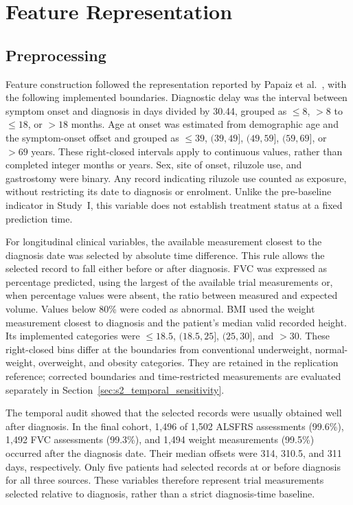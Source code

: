 \section{Feature Representation}
\label{sec:s2_features}

\subsection{Preprocessing}
\label{subsec:s2_preprocessing}

Feature construction followed the representation reported by Papaiz et al.~\cite{Papaiz2024}, with the following implemented boundaries. Diagnostic delay was the interval between symptom onset and diagnosis in days divided by 30.44, grouped as $\leq8$, $>8$ to $\leq18$, or $>18$ months. Age at onset was estimated from demographic age and the symptom-onset offset and grouped as $\leq39$, $(39,49]$, $(49,59]$, $(59,69]$, or $>69$ years. These right-closed intervals apply to continuous values, rather than completed integer months or years. Sex, site of onset, riluzole use, and gastrostomy were binary. Any record indicating riluzole use counted as exposure, without restricting its date to diagnosis or enrolment. Unlike the pre-baseline indicator in Study~I, this variable does not establish treatment status at a fixed prediction time.

For longitudinal clinical variables, the available measurement closest to the diagnosis date was selected by absolute time difference. This rule allows the selected record to fall either before or after diagnosis. FVC was expressed as percentage predicted, using the largest of the available trial measurements or, when percentage values were absent, the ratio between measured and expected volume. Values below 80\% were coded as abnormal. BMI used the weight measurement closest to diagnosis and the patient's median valid recorded height. Its implemented categories were $\leq18.5$, $(18.5,25]$, $(25,30]$, and $>30$. These right-closed bins differ at the boundaries from conventional underweight, normal-weight, overweight, and obesity categories. They are retained in the replication reference; corrected boundaries and time-restricted measurements are evaluated separately in Section~\ref{sec:s2_temporal_sensitivity}.

The temporal audit showed that the selected records were usually obtained well after diagnosis. In the final cohort, 1,496 of 1,502 ALSFRS assessments (99.6\%), 1,492 FVC assessments (99.3\%), and 1,494 weight measurements (99.5\%) occurred after the diagnosis date. Their median offsets were 314, 310.5, and 311 days, respectively. Only five patients had selected records at or before diagnosis for all three sources. These variables therefore represent trial measurements selected relative to diagnosis, rather than a strict diagnosis-time baseline.

